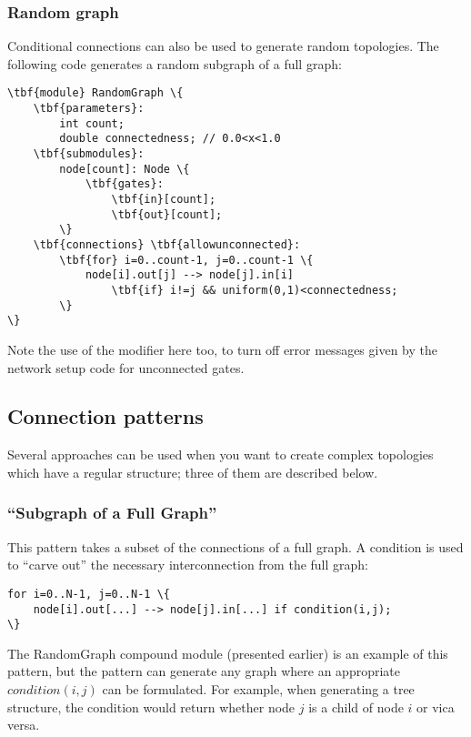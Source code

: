 \subsubsection{Random graph}

Conditional connections can also be used to generate random
topologies.  The following code generates a
random subgraph of a full graph:

\begin{Verbatim}[commandchars=\\\{\}]
\tbf{module} RandomGraph \{
    \tbf{parameters}:
        int count;
        double connectedness; // 0.0<x<1.0
    \tbf{submodules}:
        node[count]: Node \{
            \tbf{gates}:
                \tbf{in}[count];
                \tbf{out}[count];
        \}
    \tbf{connections} \tbf{allowunconnected}:
        \tbf{for} i=0..count-1, j=0..count-1 \{
            node[i].out[j] --> node[j].in[i]
                \tbf{if} i!=j && uniform(0,1)<connectedness;
        \}
\}
\end{Verbatim}

Note the use of the  modifier
here too, to turn off error messages given by the network setup code
for unconnected gates.


\subsection{Connection patterns}


Several approaches can be used when you want to create complex
topologies which have a regular structure; three of them are
described below.


\subsubsection{``Subgraph of a Full Graph''}


This pattern takes a subset of the connections of a full graph.  A
condition is used to ``carve out'' the necessary interconnection from
the full graph:

\begin{Verbatim}[commandchars=\\\{\}]
for i=0..N-1, j=0..N-1 \{
    node[i].out[...] --> node[j].in[...] if condition(i,j);
\}
\end{Verbatim}

The RandomGraph compound module (presented earlier) is an example of
this pattern, but the pattern can generate any graph where an
appropriate $condition(i,j)$ can be formulated. For example,
when generating a tree structure, the condition
would return whether node $j$ is a child of node $i$ or
vica versa.

